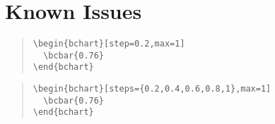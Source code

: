 \documentclass{article}
\begin{document}
\section{Known Issues}

\begin{quote}\small
\begin{verbatim}
\begin{bchart}[step=0.2,max=1]
  \bcbar{0.76}
\end{bchart}
\end{verbatim}
\end{quote}
\begin{quote}
\begin{bchart}[step=0.2,max=1]
\end{bchart}
\end{quote}

\begin{quote}\small
\begin{verbatim}
\begin{bchart}[steps={0.2,0.4,0.6,0.8,1},max=1]
  \bcbar{0.76}
\end{bchart}
\end{verbatim}
\end{quote}
\begin{quote}
\begin{bchart}[steps={0.2,0.4,0.6,0.8,1},max=1]
\end{bchart}
\end{quote}
\end{document}
